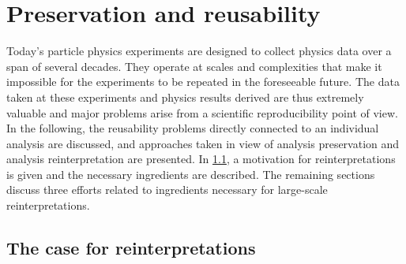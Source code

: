 
\chapter{Preservation and reusability}\label{ch:preservation}

\ifpdf
    \graphicspath{{chapter-preservation/Figs/Raster/}{chapter-preservation/Figs/PDF/}{chapter-preservation/Figs/}}
\else
    \graphicspath{{chapter-preservation/Figs/Vector/}{chapter-preservation/Figs/}}
\fi

Today's particle physics experiments are designed to collect physics data over a span of several decades. They operate at scales and complexities that make it impossible for the experiments to be repeated in the foreseeable future. The data taken at these experiments and physics results derived are thus extremely valuable and major problems arise from a scientific reproducibility point of view. In the following, the reusability problems directly connected to an individual analysis are discussed, and approaches taken in view of analysis preservation and analysis reinterpretation are presented. In \cref{sec:reinterpretations}, a motivation for reinterpretations is given and the necessary ingredients are described. The remaining sections discuss three efforts related to ingredients necessary \eg for large-scale reinterpretations.

\section{The case for reinterpretations}\label{sec:reinterpretations}

